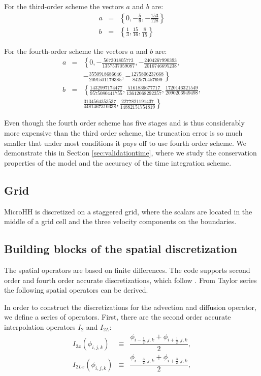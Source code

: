 \documentclass[gmd]{copernicus}
\begin{document}
For the third-order scheme the vectors $a$ and $b$ are:
\begin{eqnarray}
a & = & \left\{0, -\frac{5}{9}, -\frac{153}{128} \right\}\\
b & = & \left\{\frac{1}{3}, \frac{15}{16}, \frac{8}{15} \right\}
\end{eqnarray}

For the fourth-order scheme the vectors $a$ and $b$ are:
\begin{eqnarray}
\nonumber a & = & \left\{0, -\frac{567301805773}{1357537059087},
-\frac{2404267990393}{2016746695238},\right.\\
& & \left. -\frac{3550918686646}{2091501179385},
-\frac{1275806237668}{842570457699} \right\}\\
\nonumber b & = & \left\{\frac{1432997174477}{9575080441755}, \frac{5161836677717}{13612068292357},
\frac{1720146321549}{2090206949498},\right.\\
& & \left. \frac{3134564353537}{4481467310338},
\frac{2277821191437}{14882151754819} \right\}
\end{eqnarray}

Even though the fourth order scheme has five stages and is thus considerably more expensive than the third order scheme, the truncation error is so much smaller that under most conditions it pays off to use fourth order scheme. We demonstrate this in Section \ref{sec:validationtime}, where we study the conservation properties of the model and the accuracy of the time integration scheme.

\subsection{Grid}
MicroHH is discretized on a staggered grid, where the scalars are located in the middle of a grid cell and the three velocity components on the boundaries. 

\subsection{Building blocks of the spatial discretization}
The spatial operators are based on finite differences. The code supports second order and fourth order accurate discretizations, which follow \citet{Morinishi1998, Vasilyev2000}. From Taylor series the following spatial operators can be derived.

In order to construct the discretizations for the advection and diffusion operator, we define a series of operators.
First, there are the second order accurate interpolation operators $I_2$ and $I_{2L}$:
\begin{eqnarray}
I_{2x}  \left( \phi_{i,j,k} \right) & \equiv & \dfrac{\phi_{i-\frac{1}{2},j,k} + \phi_{i+\frac{1}{2},j,k}}{2},\\
I_{2Lx} \left( \phi_{i,j,k} \right) & \equiv & \dfrac{\phi_{i-\frac{3}{2},j,k} + \phi_{i+\frac{3}{2},j,k}}{2},
\end{eqnarray}
\end{document}
